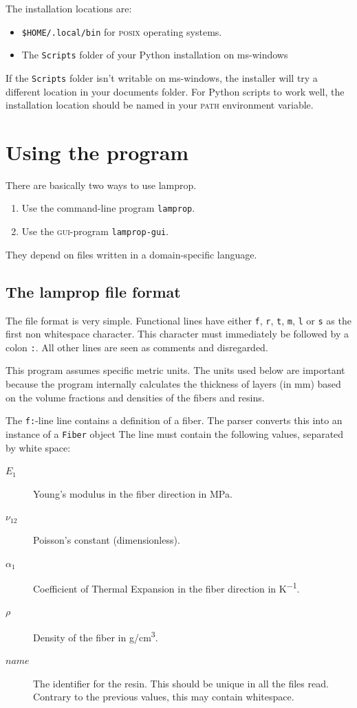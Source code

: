 \documentclass[a4paper,landscape,oneside,11pt,twocolumn]{memoir}
\begin{document}
The installation locations are:
\begin{itemize}
    \item \verb|$HOME/.local/bin| for \textsc{posix} operating systems.
    \item The \verb|Scripts| folder of your Python installation on
        ms-windows
\end{itemize}
If the \verb|Scripts| folder isn't writable on ms-windows, the installer will
try a different location in your documents folder.
For Python scripts to work well, the installation location should be named in
your \textsc{path} environment variable.


\chapter{Using the program} %

There are basically two ways to use lamprop.

\begin{enumerate}
    \item Use the command-line program \texttt{lamprop}.
    \item Use the \textsc{gui}-program \texttt{lamprop-gui}.
\end{enumerate}

They depend on files written in a domain-specific language.

\section{The lamprop file format} %

The file format is very simple. Functional lines have either \texttt{f},
\texttt{r}, \texttt{t}, \texttt{m}, \texttt{l} or \texttt{s} as the first
non whitespace character. This character must immediately be followed by
a colon \texttt{:}. All other lines are seen as comments and disregarded.

This program assumes specific metric units. The units used below are important
because the program internally calculates the thickness of layers (in mm)
based on the volume fractions and densities of the fibers and resins.

The \texttt{f:}-line line contains a definition of a fiber. The parser
converts this into an instance of a \texttt{Fiber} object The line must
contain the following values, separated by white space:
\begin{description}
    \item[$E_1$] Young's modulus in the fiber direction in \si{MPa}.
    \item[$\nu_{12}$] Poisson's constant (dimensionless).
    \item[$\alpha_1$] Coefficient of Thermal Expansion in the fiber direction
        in \si{K^{-1}}.
    \item[$\rho$] Density of the fiber in \si{g/cm^3}.
    \item[$name$] The identifier for the resin. This should be unique in all
        the files read. Contrary to the previous values, this may contain
        whitespace.
\end{description}
\end{document}

